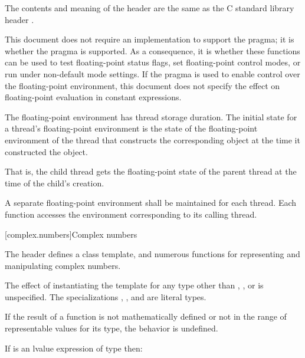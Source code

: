 \pnum
The contents and meaning of the header 
are the same as the C standard library header .
\begin{note}
This document does not require an implementation to support the
 pragma;
it is 
whether the pragma is supported. As a consequence,
it is 
whether these functions can be used to test floating-point status flags,
set floating-point control modes, or run under non-default mode settings.
If the pragma is used to enable control over the floating-point environment,
this document does not specify the effect on
floating-point evaluation in constant expressions.
\end{note}

\pnum
The floating-point environment has thread storage
duration. The initial state for a thread's floating-point
environment is the state of the floating-point environment of the thread that constructs
the corresponding  object at the time it
constructed the object. \begin{note} That is, the child thread gets the floating-point
state of the parent thread at the time of the child's creation. \end{note}

\pnum
A separate floating-point environment shall be maintained for each thread. Each function
accesses the environment corresponding to its calling thread.


[complex.numbers]{Complex numbers}

\pnum
The header
%
defines a
class template,
and numerous functions for representing and manipulating complex numbers.

\pnum
The effect of instantiating the template
for any type other than , , or  is unspecified.
The specializations
,
, and
 are literal types.

\pnum
If the result of a function is not mathematically defined or not in
the range of representable values for its type, the behavior is
undefined.

\pnum
If  is an lvalue expression of type \cv{}  then:


